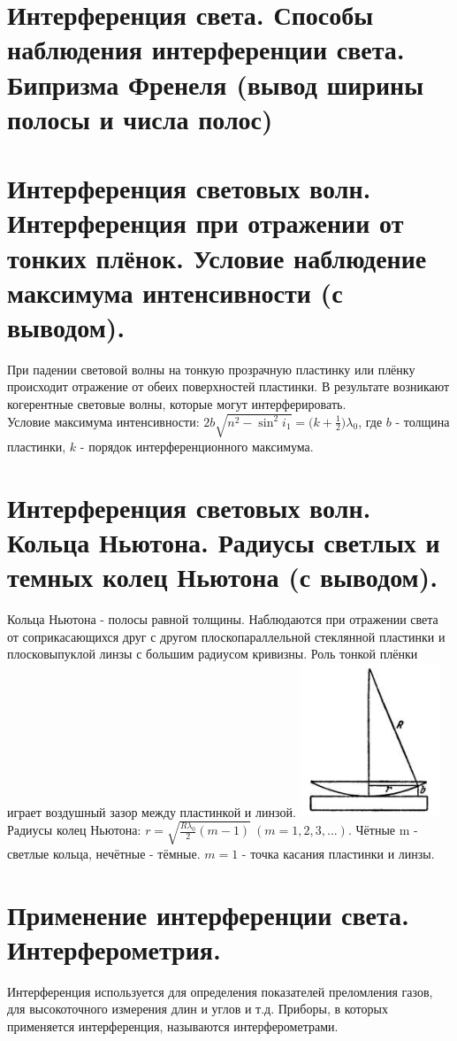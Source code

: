 \documentclass[14pt]{extarticle}
\begin{document}
\section{Интерференция света. Способы наблюдения интерференции света. Бипризма Френеля
(вывод ширины полосы и числа полос)}
\section{Интерференция световых волн. Интерференция при отражении от тонких плёнок.
Условие наблюдение максимума интенсивности (с выводом).}
При падении световой волны на тонкую прозрачную пластинку или плёнку 
происходит отражение от обеих поверхностей пластинки. В результате возникают
когерентные световые волны, которые могут интерферировать.\\
Условие максимума интенсивности: 
$2b \sqrt{n^2 - \sin^2 i_1} = \bigl(k + \frac{1}{2}\bigr) \lambda_0$, где
$b$ - толщина пластинки, $k$ - порядок интерференционного максимума. 
\section{Интерференция световых волн. Кольца Ньютона. Радиусы светлых и темных колец
Ньютона (с выводом).}
Кольца Ньютона - полосы равной толщины. Наблюдаются при отражении света 
от соприкасающихся друг с другом плоскопараллельной стеклянной пластинки 
и плосковыпуклой линзы с большим радиусом кривизны. Роль тонкой плёнки 
играет воздушный зазор между пластинкой и линзой. 
\includegraphics{newton_rings.png}
Радиусы колец Ньютона: $r = \sqrt{\frac{R \lambda_0}{2} (m-1)} \ 
(m = 1, 2, 3, ...)$. Чётные m - светлые кольца, нечётные - тёмные. 
$m = 1$ - точка касания пластинки и линзы. 
\section{Применение интерференции света. Интерферометрия.}
Интерференция используется для определения показателей преломления газов, 
для высокоточного измерения длин и углов и т.д. Приборы, в которых применяется
интерференция, называются интерферометрами. 
\end{document}
